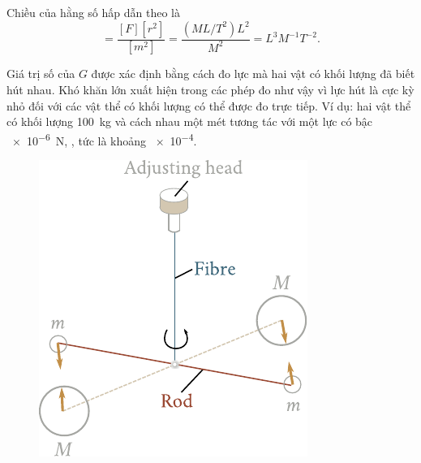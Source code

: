 Chiều của hằng số hấp dẫn theo  là
\begin{equation*}
	[G] = \frac{[F][r^2]}{[m^2]} = \frac{(ML/T^2)L^2}{M^2} = L^3M^{-1}T^{-2}.
\end{equation*}

\noindent
Giá trị số của $G$ được xác định bằng cách đo lực mà hai vật có khối lượng đã biết hút nhau. Khó khăn lớn xuất hiện trong các phép đo như vậy vì lực hút là cực kỳ nhỏ đối với các vật thể có khối lượng có thể được đo trực tiếp. Ví dụ: hai vật thể có khối lượng \SI{100}{\kilo\gram} và cách nhau một mét tương tác với một lực có bậc \SI{e-6}{\newton}, \ie, tức là khoảng \SI{e-4}{\gf}.

\begin{figure}[!htb]
	\begin{center}
		\includegraphics[scale=0.95]{figures/ch_06/fig_6_3.pdf}
		\caption[]{}
		\label{fig:6_3}
	\end{center}
\end{figure}

